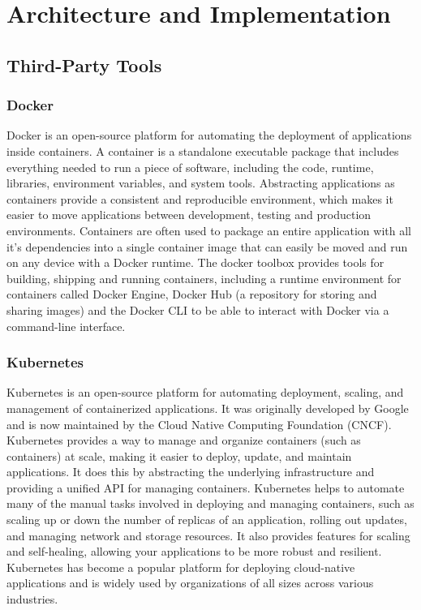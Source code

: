 \chapter{Architecture and Implementation}
\label{ch:architecture-and-implementation}

\section{Third-Party Tools}
\label{sec:third-party-tools-architecture}

\subsection{Docker}
\label{sec:docker-evaluation-setup}

  Docker is an open-source platform for automating the deployment of applications inside containers. A container is a standalone executable package that includes everything needed to run a piece of software, including the code, runtime, libraries, environment variables, and system tools.
  Abstracting applications as containers provide a consistent and reproducible environment, which makes it easier to move applications between development, testing and production environments.
  Containers are often used to package an entire application with all it's dependencies into a single container image that can easily be moved and run on any device with a Docker runtime.
  The docker toolbox provides tools for building, shipping and running containers, including a runtime environment for containers called Docker Engine, Docker Hub (a repository for storing and sharing images) and the Docker CLI to be able to interact with Docker via a command-line interface.

\subsection{Kubernetes}
\label{sec:kubernetes-evaluation-setup}
  Kubernetes is an open-source platform for automating deployment, scaling, and management of containerized applications. It was originally developed by Google and is now maintained by the Cloud Native Computing Foundation (CNCF).
  Kubernetes provides a way to manage and organize containers (such as  containers) at scale, making it easier to deploy, update, and maintain applications. It does this by abstracting the underlying infrastructure and providing a unified API for managing containers.
  Kubernetes helps to automate many of the manual tasks involved in deploying and managing containers, such as scaling up or down the number of replicas of an application, rolling out updates, and managing network and storage resources. It also provides features for scaling and self-healing, allowing your applications to be more robust and resilient.
  Kubernetes has become a popular platform for deploying cloud-native applications and is widely used by organizations of all sizes across various industries.

